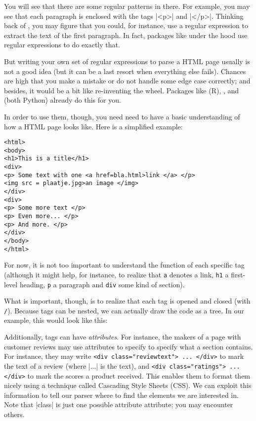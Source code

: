 You will see that there are some regular patterns in there. For
example, you may see that each paragraph is enclosed with the tags
|<p>| and |</p>|. Thinking back of , you may figure
that you could, for instance, use a regular expression to extract
the text of the first paragraph. In fact, packages like 
under the hood use regular expressions to do exactly that.

But writing your own set of regular expressions to parse a HTML
page usually is not a good idea (but it can be a last resort when
everything else fails). Chances are high that you make
a mistake or do not handle some edge case correctly; and besides,
it would be a bit like re-inventing the wheel. Packages like
 (R), , and  (both Python)
already do this for you.

In order to use them, though, you need need to have a basic
understanding of how a HTML page looks like. Here is a simplified
example:

\begin{lstlisting}
<html>
<body>
<h1>This is a title</h1>
<div>
<p> Some text with one <a href=bla.html>link </a> </p>
<img src = plaatje.jpg>an image </img>
</div>
<div>
<p> Some more text </p>
<p> Even more... </p>
<p> And more. </p>
</div>
</body>
</html>
\end{lstlisting}

For now, it is not too important to understand the function of each
specific tag (although it might help, for instance, to realize that
\texttt{a} denotes a link, \texttt{h1} a first-level heading,
\texttt{p} a paragraph and \texttt{div} some kind of section).

What is important, though, is to realize that each tag is opened and
closed (with \texttt{/}). Because tags can be nested, we can actually
draw the code as a tree. In our example, this would look like this:



Additionally, tags can have \emph{attributes}. For instance, the
makers of a page with customer reviews may use attributes to specify
to specify what a section contains. For instance, they may write
\texttt{<div class="reviewtext"> ... </div>}  to mark the text of a review (where
|...| is the text), and \texttt{<div class="ratings"> ...</div>} to mark the
scores a product received. This enables them to format them nicely
using a technique called Cascading Style Sheets (CSS). We can exploit
this information to tell our parser where to find the elements we
are interested in. Note that |class| is just one possible attribute
attribute; you may encounter others.

